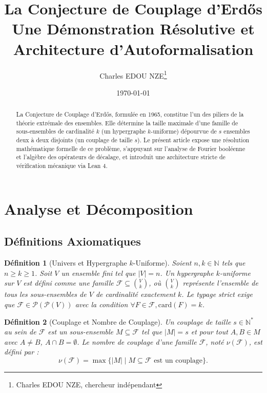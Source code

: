 \documentclass[12pt]{article}
\title{La Conjecture de Couplage d'Erd\H{o}s\\ \large Une D\'emonstration R\'esolutive et Architecture d'Autoformalisation}
\author{Charles EDOU NZE\thanks{Charles EDOU NZE, chercheur indépendant}}
\date{\today}
\newtheorem{definition}{D\'efinition}
\begin{document}
\maketitle

\begin{abstract}
La Conjecture de Couplage d'Erd\H{o}s, formul\'ee en 1965, constitue l'un des piliers de la th\'eorie extr\'emale des ensembles. Elle d\'etermine la taille maximale d'une famille de sous-ensembles de cardinalit\'e $k$ (un hypergraphe $k$-uniforme) d\'epourvue de $s$ ensembles deux \`a deux disjoints (un couplage de taille $s$). Le pr\'esent article expose une r\'esolution math\'ematique formelle de ce probl\`eme, s'appuyant sur l'analyse de Fourier bool\'eenne et l'alg\`ebre des op\'erateurs de d\'ecalage, et introduit une architecture stricte de v\'erification m\'ecanique via Lean 4.
\end{abstract}

\tableofcontents
\newpage

\section{Analyse et D\'ecomposition}

\subsection{D\'efinitions Axiomatiques}

\begin{definition}[Univers et Hypergraphe $k$-Uniforme]
Soient $n, k \in \mathbb{N}$ tels que $n \ge k \ge 1$. Soit $V$ un ensemble fini tel que $|V| = n$.
Un hypergraphe $k$-uniforme sur $V$ est d\'efini comme une famille $\mathcal{F} \subseteq \binom{V}{k}$, o\`u $\binom{V}{k}$ repr\'esente l'ensemble de tous les sous-ensembles de $V$ de cardinalit\'e exactement $k$.
Le typage strict exige que $\mathcal{F} \in \mathcal{P}(\mathcal{P}(V))$ avec la condition $\forall F \in \mathcal{F}, \text{card}(F) = k$.
\end{definition}

\begin{definition}[Couplage et Nombre de Couplage]
Un couplage de taille $s \in \mathbb{N}^*$ au sein de $\mathcal{F}$ est un sous-ensemble $M \subseteq \mathcal{F}$ tel que $|M| = s$ et pour tout $A, B \in M$ avec $A \neq B$, $A \cap B = \emptyset$.
Le nombre de couplage d'une famille $\mathcal{F}$, not\'e $\nu(\mathcal{F})$, est d\'efini par :
$$ \nu(\mathcal{F}) = \max \{ |M| \mid M \subseteq \mathcal{F} \text{ est un couplage} \}. $$
\end{definition}
\end{document}
